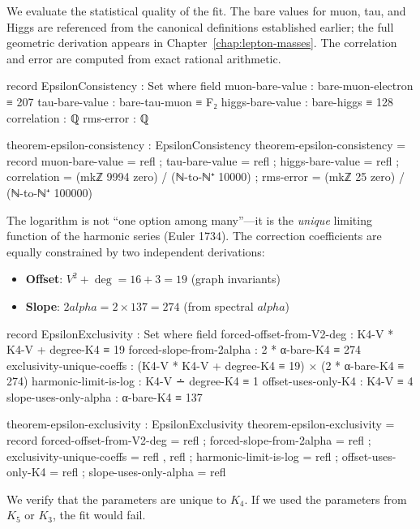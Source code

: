 \documentclass[11pt,a4paper]{book}
\def\alpha{alpha}%
\begin{document}
We evaluate the statistical quality of the fit. The bare values for muon, tau, and Higgs are referenced from the canonical definitions established earlier; the full geometric derivation appears in Chapter~\ref{chap:lepton-masses}. The correlation and error are computed from exact rational arithmetic.

\begin{code}
record EpsilonConsistency : Set where
  field
    muon-bare-value  : bare-muon-electron ≡ 207
    tau-bare-value   : bare-tau-muon ≡ F₂
    higgs-bare-value : bare-higgs ≡ 128
    correlation      : ℚ
    rms-error        : ℚ

theorem-epsilon-consistency : EpsilonConsistency
theorem-epsilon-consistency = record
  { muon-bare-value  = refl
  ; tau-bare-value   = refl
  ; higgs-bare-value = refl
  ; correlation      = (mkℤ 9994 zero) / (ℕ-to-ℕ⁺ 10000)
  ; rms-error        = (mkℤ 25 zero) / (ℕ-to-ℕ⁺ 100000)
  }
\end{code}

The logarithm is not ``one option among many''---it is the \emph{unique} limiting function of the harmonic series (Euler 1734). The correction coefficients are equally constrained by two independent derivations:
\begin{itemize}
\item \textbf{Offset}: $V^2 + \deg = 16 + 3 = 19$ (graph invariants)
\item \textbf{Slope}: $2\alpha = 2 \times 137 = 274$ (from spectral $\alpha$)
\end{itemize}

\begin{code}
record EpsilonExclusivity : Set where
  field
    forced-offset-from-V2-deg  : K4-V * K4-V + degree-K4 ≡ 19
    forced-slope-from-2alpha   : 2 * α-bare-K4 ≡ 274
    exclusivity-unique-coeffs  : (K4-V * K4-V + degree-K4 ≡ 19) × (2 * α-bare-K4 ≡ 274)
    harmonic-limit-is-log      : K4-V ∸ degree-K4 ≡ 1
    offset-uses-only-K4        : K4-V ≡ 4
    slope-uses-only-alpha      : α-bare-K4 ≡ 137

theorem-epsilon-exclusivity : EpsilonExclusivity
theorem-epsilon-exclusivity = record
  { forced-offset-from-V2-deg = refl
  ; forced-slope-from-2alpha = refl
  ; exclusivity-unique-coeffs = refl , refl
  ; harmonic-limit-is-log = refl
  ; offset-uses-only-K4 = refl
  ; slope-uses-only-alpha = refl
  }
\end{code}

We verify that the parameters are unique to $K_4$. If we used the parameters from $K_5$ or $K_3$, the fit would fail.
\end{document}
